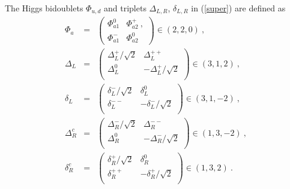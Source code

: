 \documentclass[prd,aps,preprint,tightenlines,superscriptaddress]{revtex4}
\begin{document}
The Higgs bidoublets $\Phi_{u,d}$ and triplets $\Delta_{L,R}$, $\delta_{L,R}$ in
(\ref{super}) are defined as
\begin{eqnarray}
\Phi_{a} &=& \left( \begin{array}{cc} \Phi_{a1}^0 & \Phi_{a2}^+ \ ,  \\
\Phi_{a1}^- & \Phi_{a2}^0 \end{array} \right) \in \left(2, 2, 0\right)
\ , \nonumber\\
\Delta_L &=& \left( \begin{array}{cc} \Delta_{L}^+ / \sqrt{2} & \Delta_{L}^{++} \\ \Delta_{L}^{0} & - \Delta_{L}^+ / \sqrt{2}\\
\end{array} \right) \in \left(3, 1, 2\right) \ , \nonumber \\
\delta_L &=& \left( \begin{array}{cc} \delta_{L}^- / \sqrt{2} & \delta_{L}^{0} \\ \delta_{L}^{--} & - \delta_{L}^- / \sqrt{2}\\
\end{array} \right) \in \left(3, 1, -2\right) \ , \nonumber \\
\Delta_R^c &=& \left( \begin{array}{cc} \Delta_{R}^- / \sqrt{2} & \Delta_{R}^{--} \\ \Delta_{R}^{0} & -\Delta_{R}^- / \sqrt{2} \\
\end{array} \right) \in \left(1, 3, -2\right) \ , \nonumber\\
\delta_R^c &=& \left( \begin{array}{cc} \delta_{R}^+ / \sqrt{2} & \delta_{R}^{0} \\ \delta_{R}^{++} & - \delta_{R}^+ / \sqrt{2}\\
\end{array} \right) \in \left(1, 3, 2\right) \ .
\end{eqnarray}
\end{document}
